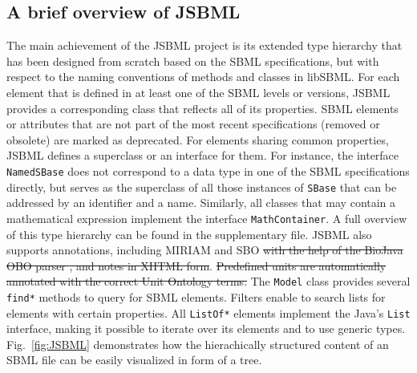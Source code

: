 \documentclass{bioinfo}
\begin{document}
\begin{methods}
\section{A brief overview of JSBML}

The main achievement of the JSBML project is its extended type hierarchy that has been designed 
from scratch based on the SBML specifications, but with respect to the naming conventions of
methods and classes in libSBML. For each element that is defined in at least one of the SBML levels 
or versions, JSBML provides a corresponding class that reflects all of its
properties. SBML elements or attributes that are not part of the most 
recent specifications (removed or obsolete) are marked as deprecated. For
elements sharing common properties, JSBML defines a superclass or an interface
for them. For instance, the interface \texttt{NamedSBase} does not correspond to a 
data type in one of the SBML specifications directly, but serves as the
superclass of all those instances of \texttt{SBase} that can be addressed by an identifier and
a name. Similarly, all classes that may contain a mathematical expression implement the 
interface \texttt{MathContainer}. A full overview of this type hierarchy can be found in the supplementary
file. JSBML also supports annotations, including MIRIAM \citep{Novere2005} and SBO \citep{Novere2006b} 
\sout{with the help of the BioJava OBO parser \citep{Holland2008}, and notes in
XHTML form}. \sout{Predefined units are automatically annotated with the correct
Unit Ontology terms.} The \texttt{Model} class provides several \texttt{find*}
methods to query for SBML elements. Filters enable to search lists for elements with certain properties. 
All \texttt{ListOf*} elements implement the Java's \texttt{List} interface,
making it possible to iterate over its elements and to use generic types.
Fig.~\ref{fig:JSBML} demonstrates how the hierachically structured content of an SBML file 
can be easily visualized in form of a tree.
\begin{figure}
\centerline{
  }
\end{figure}
\end{methods}
\end{document}
